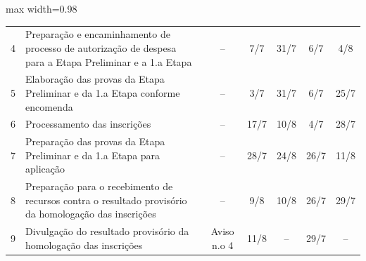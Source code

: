 \begin{landscape}
\begin{quadro}[htb]
\begin{adjustbox}{max width=0.98\linewidth}
\begin{tabular}{|c|l|c|c|c|c|c|}
4  & Preparação e   encaminhamento de processo de autorização de despesa para a Etapa Preliminar   e a 1.a Etapa                                & –                   & 7/7                                                                             & 31/7                                  & 6/7                                                                             & 4/8                  \\
\rowcolor[HTML]{FCD5B4} 
5  & Elaboração das provas   da Etapa Preliminar e da 1.a Etapa conforme encomenda                                                              & –                   & 3/7                                                                             & 31/7                                  & 6/7                                                                             & 25/7                 \\
6  & Processamento das   inscrições                                                                                                             & –                   & 17/7                                                                            & 10/8                                  & 4/7                                                                             & 28/7                 \\
7  & Preparação das provas   da Etapa Preliminar e da 1.a Etapa para aplicação                                                                  & –                   & 28/7                                                                            & 24/8                                  & 26/7                                                                            & 11/8                 \\
8  & Preparação para o   recebimento de recursos contra o resultado provisório da homologação das   inscrições                                  & –                   & 9/8                                                                             & 10/8                                  & 26/7                                                                            & 29/7                 \\
\rowcolor[HTML]{92CDDC} 
9  & Divulgação do   resultado provisório da homologação das inscrições                                                                         & Aviso n.o 4         & 11/8                                                                            & –                                     & 29/7                                                                            & –                    \\

\end{tabular}
\end{adjustbox}
\end{quadro}
\end{landscape}
